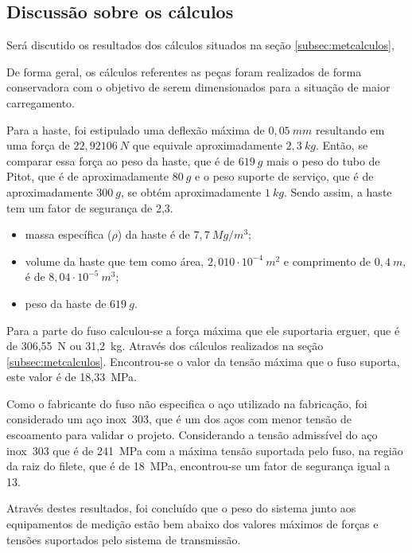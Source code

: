 \subsection{Discussão sobre os cálculos}

Será discutido os resultados dos cálculos situados na seção \ref{subsec:metcalculos}, 

De forma geral, os cálculos referentes as peças foram realizados de forma conservadora 
com o objetivo de serem dimensionados para a situação de maior carregamento.

Para a haste, foi estipulado uma deflexão máxima de $0,05~mm$ resultando em uma força de $22,92106~N$ 
que equivale aproximadamente $2,3~kg$. Então, se comparar essa força ao peso da haste, que é de $619~g$ mais 
o peso do tubo de Pitot, que é de aproximadamente $80~g$ e o peso suporte de serviço, que é de aproximadamente 
$300~g$, se obtém aproximadamente $1~kg$. Sendo assim, a haste tem um fator de segurança de 2,3. 

\begin{itemize}
    \item massa específica ($\rho$) da haste é de $7,7~Mg/m^{3}$;
    \item volume da haste que tem como área, $2,010 \cdot 10^{-4}~m^{2}$ e comprimento de $0,4~m$, é de $8,04 \cdot 10^{-5}~m^{3}$;
    \item peso da haste de $619~g$. 
\end{itemize}

Para a parte do fuso calculou-se a força máxima que ele suportaria erguer, que é de 306,55~N ou 31,2~kg. 
Através dos cálculos realizados na seção \ref{subsec:metcalculos}. Encontrou-se o valor da tensão máxima 
que o fuso suporta, este valor é de 18,33~MPa.

Como o fabricante do fuso não especifica o aço utilizado na fabricação, foi considerado um aço inox~303, 
que é um dos aços com menor tensão de escoamento para validar o projeto. Considerando a tensão admissível 
do aço inox~303 que é de 241~MPa com a máxima tensão suportada pelo fuso, na região da raiz do filete, 
que é de 18~MPa, encontrou-se um fator de segurança igual a 13. 

Através destes resultados, foi concluído que o peso do sistema junto aos equipamentos de medição estão bem 
abaixo dos valores máximos de forças e tensões suportados pelo sistema de transmissão.





